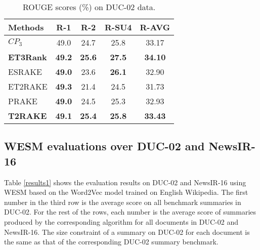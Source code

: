 \documentclass[a4paper,twoside]{article}
\begin{document}
\begin{table}[h]
\begin{center}
\caption{\label{duc} ROUGE scores (\%) on DUC-02 data.}
\begin{tabular}{l|c|c|c||c}
\hline
\bf Methods & \bf R-1 & \bf R-2 & \bf R-SU4 & \bf R-AVG \\
\hline
$CP_3$& 49.0 & 24.7 & 25.8 & 33.17 \\
\hline
\bf ET3Rank & \bf 49.2 & \bf 25.6 & \bf 27.5 & \bf 34.10 \\
ESRAKE & \bf 49.0 & 23.6 & \bf 26.1 &  32.90 \\
ET2RAKE & \bf 49.3 & 21.4 & 24.5  & 31.73\\
PRAKE & \bf 49.0 & 24.5 & 25.3 & 32.93\\
\bf T2RAKE & \bf 49.1 & \bf 25.4 & \bf 25.8 & \bf 33.43 \\
\hline
\end{tabular}
\end{center}
\end{table}

\subsection{WESM evaluations over DUC-02 and NewsIR-16}

%
Table \ref{results1} shows the evaluation results on DUC-02 and NewsIR-16 using WESM based on the Word2Vec model trained on English Wikipedia.
The first number in the third row is the average score on all benchmark summaries in DUC-02.
For the rest of the rows, each number is the average
score of summaries produced by the corresponding algorithm for all documents in DUC-02 and NewsIR-16.
The size constraint of a summary on DUC-02 for each document is the same as that of the corresponding DUC-02 summary benchmark.
\end{document}
